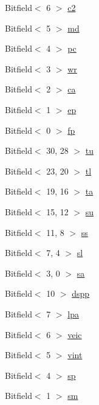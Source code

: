 \begin{DoxyCompactItemize}
\item 
Bitfield$<$ 6 $>$ \hyperlink{namespaceMipsISA_af545a7d7c9648376a8762e362f9ca024}{c2}
\item 
Bitfield$<$ 5 $>$ \hyperlink{namespaceMipsISA_aed4c6005f91b7fdeeca47124687f1674}{md}
\item 
Bitfield$<$ 4 $>$ \hyperlink{namespaceMipsISA_a70af401addf580de8d9ddd8af1165481}{pc}
\item 
Bitfield$<$ 3 $>$ \hyperlink{namespaceMipsISA_acb875e343dce4a10ce758f28e6bb45e2}{wr}
\item 
Bitfield$<$ 2 $>$ \hyperlink{namespaceMipsISA_ac82727b2bc87f74aec8c94902d28b6e7}{ca}
\item 
Bitfield$<$ 1 $>$ \hyperlink{namespaceMipsISA_a97949e899f8648055de80f01587db8a2}{ep}
\item 
Bitfield$<$ 0 $>$ \hyperlink{namespaceMipsISA_a3233167b16e632eb21dbd7f259511ddd}{fp}
\item 
Bitfield$<$ 30, 28 $>$ \hyperlink{namespaceMipsISA_a14755171c87cd0d1f3adc519f906784b}{tu}
\item 
Bitfield$<$ 23, 20 $>$ \hyperlink{namespaceMipsISA_a054bc5cc3193b2c04ef65c0abe135191}{tl}
\item 
Bitfield$<$ 19, 16 $>$ \hyperlink{namespaceMipsISA_abca6e3c0638968dfcc82d907ea423cde}{ta}
\item 
Bitfield$<$ 15, 12 $>$ \hyperlink{namespaceMipsISA_aa23d5ff31cbc2bb3a86a2b8283744816}{su}
\item 
Bitfield$<$ 11, 8 $>$ \hyperlink{namespaceMipsISA_a5a2a6a335bce62d3556fa7bc475b3cd6}{ss}
\item 
Bitfield$<$ 7, 4 $>$ \hyperlink{namespaceMipsISA_a1c270fe7d427d315732ce89065669af0}{sl}
\item 
Bitfield$<$ 3, 0 $>$ \hyperlink{namespaceMipsISA_ac5212d09029b84b4ed4df34dd739329a}{sa}
\item 
Bitfield$<$ 10 $>$ \hyperlink{namespaceMipsISA_abf9c3409798ceb97ce38fdd3d3b9b09e}{dspp}
\item 
Bitfield$<$ 7 $>$ \hyperlink{namespaceMipsISA_ad10762369644978ef5d65ed32e9c62b8}{lpa}
\item 
Bitfield$<$ 6 $>$ \hyperlink{namespaceMipsISA_af60b6cf455b82f6c8973f6639e3e7568}{veic}
\item 
Bitfield$<$ 5 $>$ \hyperlink{namespaceMipsISA_abc57668ac21986bfc581884533f58c32}{vint}
\item 
Bitfield$<$ 4 $>$ \hyperlink{namespaceMipsISA_aec732cfc085807a8a81c2534c69cea56}{sp}
\item 
Bitfield$<$ 1 $>$ \hyperlink{namespaceMipsISA_a54c7875eaf2634ca9f55701aee2a22e5}{sm}

\end{DoxyCompactItemize}
